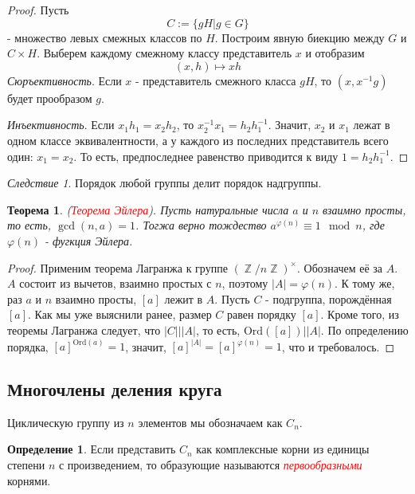 \documentclass[a4paper,100pt]{article}
\theoremstyle{indented}
\newtheorem{theorem}{Теорема}
\theoremstyle{definition}
\newtheorem{defn}{Определение}
\theoremstyle{remark}
\newtheorem{cons}{Следствие}
\DeclareMathOperator{\ZZ}{\mathbb{Z}}
\begin{document}
\begin{proof}
    Пусть 
    \[
        C:=\{gH\vert g\in G\}
    \]
    - множество левых смежных классов по $H$. Построим явную биекцию между $G$ и $C\times H$. Выберем каждому смежному классу представитель $x$ и отобразим
    \[
        (x, h)\mapsto xh
    \]
    \textit{Сюръективность}. Если $x$ - представитель смежного класса $gH$, то $(x, x^{-1}g)$ будет прообразом $g$.\ 

    \textit{Инъективность}. Если $x_1h_1=x_2h_2$, то $x_2^{-1}x_1=h_2h_1^{-1}$. Значит, $x_2$ и $x_1$ лежат в одном классе эквивалентности, а у каждого из последних представитель всего один: $x_1=x_2$. То есть, предпоследнее равенство приводится к виду $1=h_2h_1^{-1}$.
\end{proof}

\begin{cons}
    Порядок любой группы делит порядок надгруппы.
\end{cons}

\begin{theorem}
    (\hypertarget{n91}{\textcolor{red}{\textit{Теорема Эйлера}}}). Пусть натуральные числа $a$ и $n$ взаимно просты, то есть, $\gcd(n,a)=1$. Тогжа верно тождество $a^{\varphi(n)}\equiv 1 \mod n$, где $\varphi(n)$ - фугкция Эйлера.
\end{theorem}

\begin{proof}
    Применим теорема Лагранжа к группе $(\ZZ/n\ZZ)^\times$. Обозначем её за $A$. $A$ состоит из вычетов, взаимно простых с $n$, поэтому $\vert A\vert=\varphi(n)$. К тому же, раз $a$ и $n$ взаимно просты, $[a]$ лежит в $A$. Пусть $C$ - подгруппа, порождённая $[a]$. Как мы уже выяснили ранее, размер $C$ равен порядку $[a]$. Кроме того, из теоремы Лагранжа следует, что $\vert C\vert |\vert A\vert$, то есть, $\text{Ord}([a])\vert \vert A\vert$. По определению порядка, $[a]^{\text{Ord}(a)}=1$, значит, $[a]^{\vert A\vert}=[a]^{\varphi(n)}=1$, что и требовалось.
\end{proof}

\resetall

\subsection{Многочлены деления круга}

Циклическую группу из $n$ элементов мы обозначаем как $C_n$.

\begin{defn}
    Если представить $C_n$ как комплексные корни из единицы степени $n$ с произведением, то образующие называются \hypertarget{n92}{\textcolor{red}{\textit{первообразными}}} корнями.
\end{defn}
\end{document}
